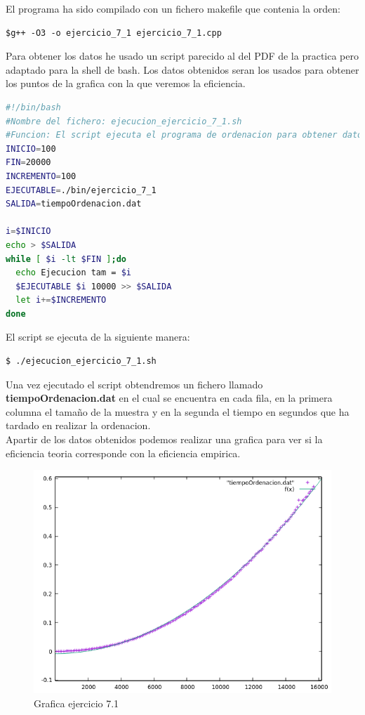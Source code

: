 \documentclass[12pt,a4psprt]{article}
\begin{document}
El programa ha sido compilado con un fichero makefile que contenia la orden:
\begin{verbatim}
$g++ -O3 -o ejercicio_7_1 ejercicio_7_1.cpp
\end{verbatim}
Para obtener los datos he usado un script parecido al del PDF de la practica pero adaptado para la shell de bash. Los datos obtenidos seran los usados para obtener los puntos de la grafica con la que veremos la eficiencia.
\begin{lstlisting}[language=bash]
#!/bin/bash
#Nombre del fichero: ejecucion_ejercicio_7_1.sh
#Funcion: El script ejecuta el programa de ordenacion para obtener datos de eficiencia
INICIO=100
FIN=20000
INCREMENTO=100
EJECUTABLE=./bin/ejercicio_7_1
SALIDA=tiempoOrdenacion.dat

i=$INICIO
echo > $SALIDA
while [ $i -lt $FIN ];do
  echo Ejecucion tam = $i
  $EJECUTABLE $i 10000 >> $SALIDA
  let i+=$INCREMENTO
done

\end{lstlisting}
El script se ejecuta de la siguiente manera:
\begin{verbatim}
$ ./ejecucion_ejercicio_7_1.sh
\end{verbatim}

Una vez ejecutado el script obtendremos un fichero llamado \textbf{tiempoOrdenacion.dat} en el cual se encuentra en cada fila, en la primera columna el tamaño de la muestra y en la segunda el tiempo en segundos que ha tardado en realizar la ordenacion.
\pagebreak
\\
Apartir de los datos obtenidos  podemos realizar una grafica para ver si la eficiencia teoria corresponde con la eficiencia empirica.
\begin{figure}[h]
\begin{center}
	\includegraphics[scale=1]{image/grafica_7_1.png}
\end{center}
\caption{Grafica ejercicio 7.1}

\end{figure}
\end{document}
